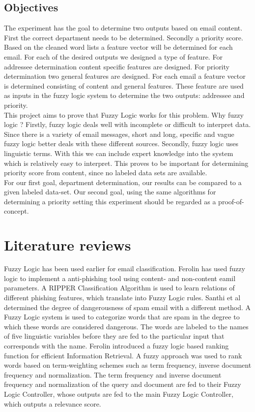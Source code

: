 \documentclass[journal]{IEEEtran}
\begin{document}
\subsection{Objectives}

The experiment has the goal to determine two outputs based on email content. First the correct department needs to be determined. Secondly a priority score. Based on the cleaned word lists a feature vector will be determined for each email. For each of the desired outputs we designed a type of feature. For addressee determination content specific features are designed. For priority determination two general features are designed. For each email a feature vector is determined consisting of content and general features. These feature are used as inputs in the fuzzy logic system to determine the two outputs: addressee and priority. \\

This project aims to prove that Fuzzy Logic works for this problem. Why fuzzy logic ? Firstly, fuzzy logic deals well with incomplete or difficult to interpret data. Since there is a variety of email messages, short and long, specific and vague fuzzy logic better deals with these different sources. Secondly, fuzzy logic uses linguistic terms. With this we can include expert knowledge into the system which is relatively easy to interpret. This proves to be important for determining priority score from content, since no labeled data sets are available. \\

For our first goal, department determination, our results can be compared to a given labeled data-set. Our second goal, using the same algorithms for determining a priority setting this experiment should be regarded as a proof-of-concept.  

\section{Literature reviews}

Fuzzy Logic has been used earlier for email classification. Ferolin \cite{phishing} 
has used fuzzy logic to implement a anti-phishing tool using content- and non-content eamil parameters. A RIPPER Classification Algorithm is used to learn relations of different phishing features, which translate into Fuzzy Logic rules. Santhi et al \cite{spam} determined the degree of dangerousness of spam email with a different method. A Fuzzy Logic system is used to categorize words that are spam in the degree to which these words are considered dangerous. The words are labeled to the names of five linguistic variables before they are fed to the particular input that corresponds with the name. Ferolin \cite{ranking} introduced a fuzzy logic based ranking function for efficient Information Retrieval. A fuzzy approach was used to rank words based on term-weighting schemes such as term frequency, inverse document frequency and normalization. The term frequency and inverse document frequency and normalization of the query and document are fed to their Fuzzy Logic Controller, whose outputs are fed to the main Fuzzy Logic Controller, which outputs a relevance score. \\
\end{document}
